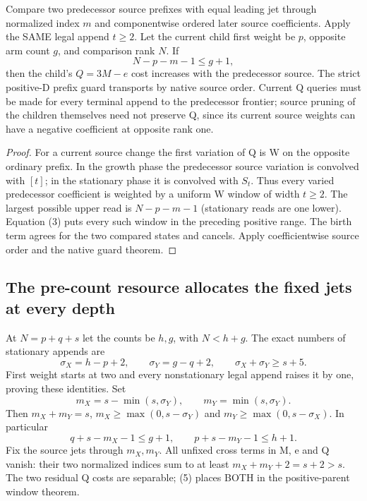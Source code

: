 \begin{theorem}
Compare two predecessor source prefixes with equal leading jet
through normalized index $m$ and componentwise ordered later source
coefficients. Apply the SAME legal append $t\ge2$. Let the current
child first weight be $p$, opposite arm count $g$, and comparison
rank $N$. If
\[
                         N-p-m-1\le g+1,           \tag{3}
\]
then the child's $Q=3M-e$ cost increases with the predecessor source.
The strict positive-D prefix guard transports by native source order.
Current Q queries must be made for every terminal append to the
predecessor frontier; source pruning of the children themselves need
not preserve Q, since its current source weights can have a negative
coefficient at opposite rank one.
\end{theorem}
\begin{proof}
For a current source change the first variation of Q is W on the
opposite ordinary prefix. In the growth phase the predecessor source
variation is convolved with $[t]$; in the stationary phase it is
convolved with $S_t$. Thus every varied predecessor coefficient is
weighted by a uniform W window of width $t\ge2$. The largest possible
upper read is $N-p-m-1$ (stationary reads are one lower).
Equation (3) puts every such window in the preceding positive range.
The birth term agrees for the two compared states and cancels.
Apply coefficientwise source order and the native guard theorem.
\end{proof}

\subsection{The pre-count resource allocates the fixed jets at every depth}
At $N=p+q+s$ let the counts be $h,g$, with $N<h+g$.
The exact numbers of stationary appends are
\[
 \sigma_X=h-p+2,\qquad \sigma_Y=g-q+2,
 \qquad\sigma_X+\sigma_Y\ge s+5.                   \tag{4}
\]
First weight starts at two and every nonstationary legal append raises
it by one, proving these identities. Set
\[
 m_X=s-\min(s,\sigma_Y),\qquad
 m_Y=\min(s,\sigma_Y).
\]
Then $m_X+m_Y=s$, $m_X\ge\max(0,s-\sigma_Y)$ and
$m_Y\ge\max(0,s-\sigma_X)$. In particular
\[
 q+s-m_X-1\le g+1,\qquad
 p+s-m_Y-1\le h+1.                                \tag{5}
\]
Fix the source jets through $m_X,m_Y$. All unfixed cross terms in
M, e and Q vanish: their two normalized indices sum to at least
$m_X+m_Y+2=s+2>s$. The two residual Q costs are separable; (5)
places BOTH in the positive-parent window theorem.

